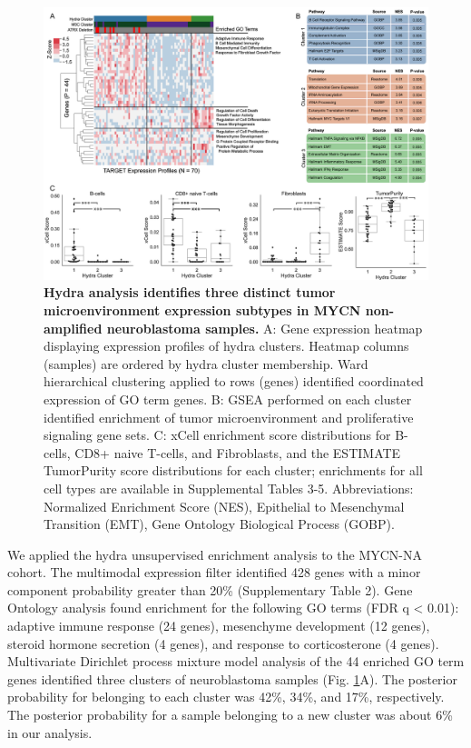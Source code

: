 \documentclass[10pt,letterpaper]{article}
\begin{document}
\begin{figure}[!h]
	\includegraphics[width=\textwidth]{img/MYCN-NA-Figure-V5@2x}
	\caption{{\bf Hydra analysis identifies three distinct tumor microenvironment expression subtypes in MYCN non-amplified neuroblastoma samples.}
		A: Gene expression heatmap displaying expression profiles of hydra clusters. Heatmap columns (samples) are ordered by hydra cluster membership. Ward hierarchical clustering applied to rows (genes) identified coordinated expression of GO term genes. B: GSEA performed on each cluster identified enrichment of tumor microenvironment and proliferative signaling gene sets. C: xCell enrichment score distributions for B-cells, CD8+ naive T-cells, and Fibroblasts, and the ESTIMATE TumorPurity score distributions for each cluster; enrichments for all cell types are available in Supplemental Tables 3-5. Abbreviations: Normalized Enrichment Score (NES), Epithelial to Mesenchymal Transition (EMT), Gene Ontology Biological Process (GOBP).
		\label{MYCN-NA}}
\end{figure}

We applied the hydra unsupervised enrichment analysis to the MYCN-NA cohort. The multimodal expression filter identified 428 genes with a minor component probability greater than 20\% (Supplementary Table 2). Gene Ontology analysis found enrichment for the following GO terms (FDR q < 0.01): adaptive immune response (24 genes), mesenchyme development (12 genes), steroid hormone secretion (4 genes), and response to corticosterone (4 genes). Multivariate Dirichlet process mixture model analysis of the 44 enriched GO term genes identified three clusters of neuroblastoma samples (Fig. \ref{MYCN-NA}A). The posterior probability for belonging to each cluster was 42\%, 34\%, and 17\%, respectively. The posterior probability for a sample belonging to a new cluster was about 6\% in our analysis. 
\end{document}
